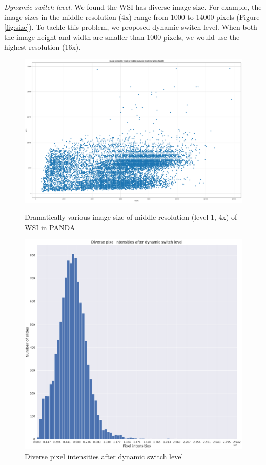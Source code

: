 \documentclass{article}
\begin{document}
\textit{Dynamic switch level}. We found the WSI has diverse image size. For example, the image sizes in the middle resolution (4x) range from 1000 to 14000 pixels (Figure \ref{fig:size}). To tackle this problem, we proposed dynamic switch level. When both the image height and width are smaller than 1000 pixels, we would use the highest resolution (16x).


\begin{figure}[!htb]
\centering
{}
	\includegraphics[width=\linewidth]{panda-level1-img-size.png}
	\caption{Dramatically various image size of middle resolution (level 1, 4x) of WSI in PANDA}
	\label{fig:size}
\endminipage\hfill
{}
	\includegraphics[width=\linewidth]{pixel-intensities.png}
  	\caption{Diverse pixel intensities after dynamic switch level}
	\label{fig:pixel}
\endminipage\hfill
\end{figure}
\end{document}
